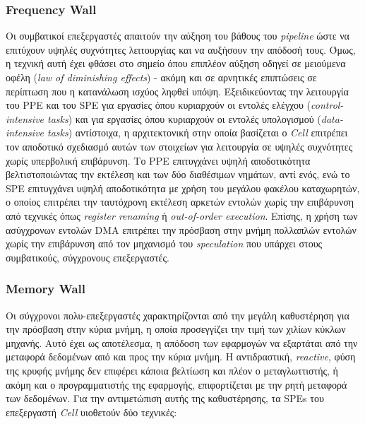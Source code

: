 \subsubsection{Frequency Wall}
\label{subsubsection:subsub3111}
\indent
Οι συμβατικοί επεξεργαστές απαιτούν την αύξηση του βάθους του \textsl{pipeline} ώστε να επιτύχουν υψηλές συχνότητες λειτουργίας και να αυξήσουν την απόδοσή τους. Όμως, η τεχνική αυτή έχει φθάσει στο σημείο όπου επιπλέον αύξηση οδηγεί σε μειούμενα οφέλη (\textsl{law of diminishing effects}) - ακόμη και σε αρνητικές επιπτώσεις σε περίπτωση που η κατανάλωση ισχύος ληφθεί υπόψη.\newline \indent
Εξειδικεύοντας την λειτουργία του \ac{PPE} και του \ac{SPE} για εργασίες όπου κυριαρχούν οι εντολές ελέγχου (\textsl{control-intensive tasks}) και για εργασίες όπου κυριαρχούν οι εντολές υπολογισμού (\textsl{data-intensive tasks}) αντίστοιχα, η αρχιτεκτονική στην οποία βασίζεται ο \textsl{Cell} επιτρέπει τον αποδοτικό σχεδιασμό αυτών των στοιχείων για λειτουργία σε υψηλές συχνότητες χωρίς υπερβολική επιβάρυνση.\newline \indent
Το \ac{PPE} επιτυγχάνει υψηλή αποδοτικότητα βελτιστοποιώντας την εκτέλεση και των δύο διαθέσιμων νημάτων, αντί ενός, ενώ το \ac{SPE} επιτυγχάνει υψηλή αποδοτικότητα με χρήση του μεγάλου φακέλου καταχωρητών, ο οποίος επιτρέπει την ταυτόχρονη εκτέλεση αρκετών εντολών χωρίς την επιβάρυνση από τεχνικές όπως \textsl{register renaming} ή \textsl{out-of-order execution}. Επίσης, η χρήση των ασύγχρονων εντολών \ac{DMA} επιτρέπει την πρόσβαση στην μνήμη πολλαπλών εντολών χωρίς την επιβάρυνση από τον μηχανισμό του \textsl{speculation} που υπάρχει στους συμβατικούς, σύγχρονους επεξεργαστές.

\subsubsection{Memory Wall}
\label{subsubsection:subsub3112}
\indent
Οι σύγχρονοι πολυ-επεξεργαστές χαρακτηρίζονται από την μεγάλη καθυστέρηση για την πρόσβαση στην κύρια μνήμη, η οποία προσεγγίζει την τιμή των χιλίων κύκλων μηχανής. Αυτό έχει ως αποτέλεσμα, η απόδοση των εφαρμογών να εξαρτάται από την μεταφορά δεδομένων από και προς την κύρια μνήμη. Η αντιδραστική, \textsl{reactive}, φύση της κρυφής μνήμης δεν επιφέρει κάποια βελτίωση και πλέον ο μεταγλωττιστής, ή ακόμη και ο προγραμματιστής της εφαρμογής, επιφορτίζεται με την ρητή μεταφορά των δεδομένων.\newline \indent
Για την αντιμετώπιση αυτής της καθυστέρησης, τα \acp{SPE} του επεξεργαστή \textsl{Cell} υιοθετούν δύο τεχνικές:

